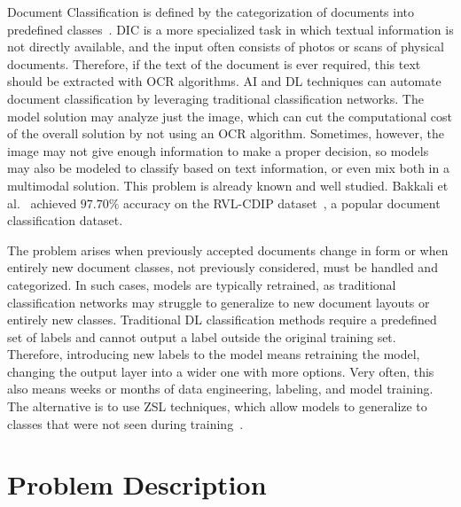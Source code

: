 Document Classification is defined by the categorization of documents into predefined classes~\cite{liu_document_2021}. \gls{DIC} is a more specialized task in which textual information is not directly available, and the input often consists of photos or scans of physical documents. Therefore, if the text of the document is ever required, this text should be extracted with \gls{OCR} algorithms. \gls{AI} and \gls{DL} techniques can automate document classification by leveraging traditional classification networks. The model solution may analyze just the image, which can cut the computational cost of the overall solution by not using an \gls{OCR} algorithm. Sometimes, however, the image may not give enough information to make a proper decision, so models may also be modeled to classify based on text information, or even mix both in a multimodal solution. This problem is already known and well studied. Bakkali et al.~\cite{bakkali_eaml_2021} achieved $97.70\%$ accuracy on the RVL-CDIP dataset~\cite{harley_evaluation_2015}, a popular document classification dataset.

The problem arises when previously accepted documents change in form or when entirely new document classes, not previously considered, must be handled and categorized. In such cases, models are typically retrained, as traditional classification networks may struggle to generalize to new document layouts or entirely new classes. Traditional \gls{DL} classification methods require a predefined set of labels and cannot output a label outside the original training set. Therefore, introducing new labels to the model means retraining the model, changing the output layer into a wider one with more options. Very often, this also means weeks or months of data engineering, labeling, and model training. The alternative is to use \gls{ZSL} techniques, which allow models to generalize to classes that were not seen during training~\cite{xian_zero-shot_2019}.


\section{Problem Description}
\label{sec:problem}


